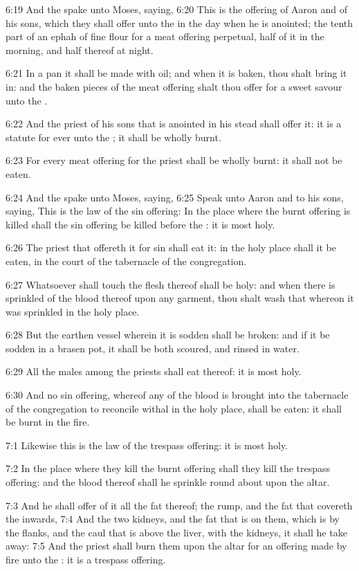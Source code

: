6:19 And the \LORD spake unto Moses, saying, 6:20 This is the offering of Aaron and of his sons, which they shall offer unto the \LORD in the day when he is anointed; the tenth part of an ephah of fine flour for a meat offering perpetual, half of it in the morning, and half thereof at night.

6:21 In a pan it shall be made with oil; and when it is baken, thou shalt bring it in: and the baken pieces of the meat offering shalt thou offer for a sweet savour unto the \LORD.

6:22 And the priest of his sons that is anointed in his stead shall offer it: it is a statute for ever unto the \LORD; it shall be wholly burnt.

6:23 For every meat offering for the priest shall be wholly burnt: it shall not be eaten.

6:24 And the \LORD spake unto Moses, saying, 6:25 Speak unto Aaron and to his sons, saying, This is the law of the sin offering: In the place where the burnt offering is killed shall the sin offering be killed before the \LORD: it is most holy.

6:26 The priest that offereth it for sin shall eat it: in the holy place shall it be eaten, in the court of the tabernacle of the congregation.

6:27 Whatsoever shall touch the flesh thereof shall be holy: and when there is sprinkled of the blood thereof upon any garment, thou shalt wash that whereon it was sprinkled in the holy place.

6:28 But the earthen vessel wherein it is sodden shall be broken: and if it be sodden in a brasen pot, it shall be both scoured, and rinsed in water.

6:29 All the males among the priests shall eat thereof: it is most holy.

6:30 And no sin offering, whereof any of the blood is brought into the tabernacle of the congregation to reconcile withal in the holy place, shall be eaten: it shall be burnt in the fire.

7:1 Likewise this is the law of the trespass offering: it is most holy.

7:2 In the place where they kill the burnt offering shall they kill the trespass offering: and the blood thereof shall he sprinkle round about upon the altar.

7:3 And he shall offer of it all the fat thereof; the rump, and the fat that covereth the inwards, 7:4 And the two kidneys, and the fat that is on them, which is by the flanks, and the caul that is above the liver, with the kidneys, it shall he take away: 7:5 And the priest shall burn them upon the altar for an offering made by fire unto the \LORD: it is a trespass offering.


